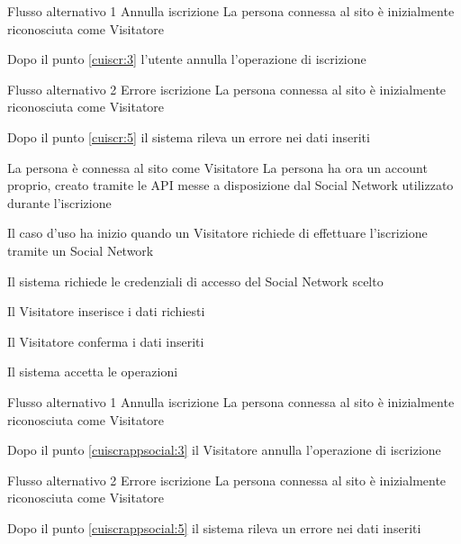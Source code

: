 {Flusso alternativo 1}%
{Annulla iscrizione}%
{La persona connessa al sito è inizialmente riconosciuta come Visitatore}%
{\postNulle}%
{\begin{enumCU}
		\item Dopo il punto \ref{cuiscr:3} l'utente annulla l'operazione di iscrizione
	\end{enumCU}}%
%
{Flusso alternativo 2}%
{Errore iscrizione}%
{La persona connessa al sito è inizialmente riconosciuta come Visitatore}%
{\postNulle}%
{\begin{enumCU}
		\item Dopo il punto \ref{cuiscr:5} il sistema rileva un errore nei dati inseriti
	\end{enumCU}}%


\tabcuvspace

{}
{La persona è connessa al sito come Visitatore}
{La persona ha ora un account proprio, creato tramite le API messe a disposizione dal Social Network utilizzato durante l'iscrizione}
{\begin{enumCU}
		\item Il caso d'uso ha inizio quando un Visitatore richiede di effettuare l'iscrizione tramite un Social Network
		\item Il sistema richiede le credenziali di accesso del Social Network scelto
		\item Il Visitatore inserisce i dati richiesti \label{cuiscrappsocial:3}
		\item Il Visitatore conferma i dati inseriti \label{cuiscrappsocial:5}
		\item Il sistema accetta le operazioni
	\end{enumCU}}

\tabcuvspace
%
{Flusso alternativo 1}%
{Annulla iscrizione}%
{La persona connessa al sito è inizialmente riconosciuta come Visitatore}%
{\postNulle}%
{\begin{enumCU}
		\item Dopo il punto \ref{cuiscrappsocial:3} il Visitatore annulla l'operazione di iscrizione
	\end{enumCU}}%
%
{Flusso alternativo 2}%
{Errore iscrizione}%
{La persona connessa al sito è inizialmente riconosciuta come Visitatore}%
{\postNulle}%
{\begin{enumCU}
		\item Dopo il punto \ref{cuiscrappsocial:5} il sistema rileva un errore nei dati inseriti
	\end{enumCU}}%

